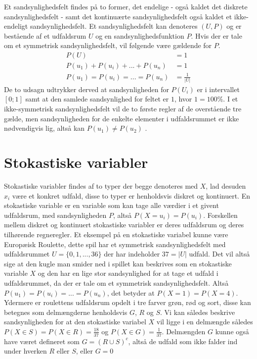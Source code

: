 \documentclass[../../SRP.tex]{subfiles}
\begin{document}
Et sandsynlighedsfelt findes på to former, det endelige - også kaldet det diskrete sandsynlighedsfelt - samt det kontinuærte sandsynlighedsfelt også kaldet et ikke-endeligt sandsynlighedsfelt. Et sandsynlighedsfelt kan denoteres $(U, P)$ og er bestående af et udfaldsrum $U$ og en sandsynlighedsfunktion $P$. Hvis der er tale om et symmetrisk sandsynlighedsfelt, vil følgende være gældende for $P$.
\begin{align}
  P(U) &= 1 \\
  P(u_1) + P(u_i) + ... + P(u_n) &= 1 \\
  P(u_1) = P(u_i) = ... = P(u_n) &= \frac{1}{|U|}
\end{align}
De to udsagn udtrykker derved at sandsynligheden for $P(U_i)$ er i intervallet $[0;1]$ samt at den samlede sandsynlighed for feltet er $1$, hvor $1 = 100\%$. I et ikke-symmetrisk sandsynlighedsfelt vil de to første regler af de overstående tre gælde, men sandsynligheden for de enkelte elementer i udfaldsrummet er ikke nødvendigvis lig, altså kan $P(u_1) \neq P(u_2)$ \cite{SC}.\\

\section{Stokastiske variabler}

Stokastiske variabler findes af to typer der begge denoteres med $X$, lad desuden $x_i$ være et konkret udfald, disse to typer er henholdsvis diskret og kontinuert. En stokastiske variable er en variable som kan tage alle værdier i et givent udfaldsrum, med sandsynligheden $P$, altså $P(X = u_i) = P(u_i)$. Forskellen mellem diskret og kontinuert stokastiske variabler er deres udfaldsrum og deres tilhørende regneregler. Et eksempel på en stokastiske variabel kunne være Europæisk Roulette, dette spil har et symmetrisk sandsynlighedsfelt med udfaldsrummet $U = \{ 0,1,...,36\}$ der har indeholder $37 = |U|$ udfald. Det vil altså sige at den kugle man smider ned i spillet kan beskrives som en stokastiske variable $X$ og den har en lige stor sandsynlighed for at tage et udfald i udfaldsrummet, da der er tale om et symmetrisk sandsynlighedsfelt. Altså $P(u_1) = P(u_i) = ... = P(u_n)$, det betyder at $P(X = 1) = P(X = 4)$. Ydermere er roulettens udfaldsrum opdelt i tre farver grøn, rød og sort, disse kan betegnes som delmængderne henholdsvis $G$, $R$ og $S$. Vi kan således beskrive sandsynligheden for at den stokastiske variabel $X$ vil ligge i en delmængde således $P(X \in S) = P(X \in R) = \frac{18}{37}$ og $P(X \in G) = \frac{1}{37}$. Delmængden $G$ kunne også have været defineret som $G = (R \cup S)^c$, altså de udfald som ikke falder ind under hverken $R$ eller $S$, eller $G = 0$ \cite{NM} \\
\end{document}
